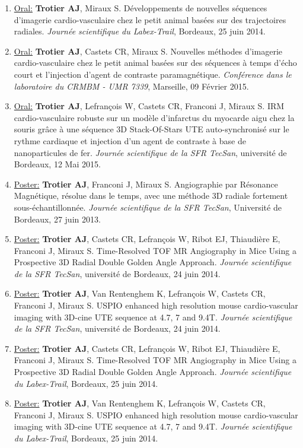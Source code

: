 \begin{enumerate}

\item \underline{Oral:} \textbf{Trotier AJ}, Miraux S. Développements de nouvelles séquences d'imagerie cardio-vasculaire chez le petit animal basées sur des trajectoires radiales. \textit{Journée scientifique du Labex-Trail}, Bordeaux, 25 juin 2014.
\item \underline{Oral:} \textbf{Trotier AJ}, Castets CR, Miraux S. Nouvelles méthodes d’imagerie cardio-vasculaire chez le petit animal basées sur des séquences à temps d’écho court et l’injection d’agent de contraste paramagnétique. \textit{Conférence dans le laboratoire du CRMBM - UMR 7339}, Marseille, 09 Février 2015.
\item \underline{Oral:} \textbf{Trotier AJ}, Lefrançois W, Castets CR, Franconi J, Miraux S. IRM cardio-vasculaire robuste sur un modèle d’infarctus du myocarde aigu chez la souris grâce à une séquence 3D Stack-Of-Stars UTE auto-synchronisé sur le rythme cardiaque et injection d’un agent de contraste à base de nanoparticules de fer. \textit{Journée scientifique de la SFR TecSan}, université de Bordeaux, 12 Mai 2015.
  
\item \underline{Poster:} \textbf{Trotier AJ}, Franconi J, Miraux S. Angiographie par Résonance Magnétique, résolue dans le temps, avec une méthode 3D radiale fortement sous-échantillonnée. \textit{Journée scientifique de la SFR TecSan}, Université de Bordeaux, 27 juin 2013.

\item \underline{Poster:} \textbf{Trotier AJ}, Castets CR, Lefrançois W, Ribot EJ, Thiaudière E, Franconi J, Miraux S. Time-Resolved TOF MR Angiography in Mice Using a Prospective 3D Radial Double Golden Angle Approach. \textit{Journée scientifique de la SFR TecSan}, université de Bordeaux, 24 juin 2014.
\item \underline{Poster:} \textbf{Trotier AJ}, Van Rentenghem K, Lefrançois W, Castets CR, Franconi J, Miraux S. USPIO enhanced high resolution mouse cardio-vascular imaging with 3D-cine UTE sequence at 4.7, 7 and 9.4T. \textit{Journée scientifique de la SFR TecSan}, université de Bordeaux, 24 juin 2014.

\item \underline{Poster:} \textbf{Trotier AJ}, Castets CR, Lefrançois W, Ribot EJ, Thiaudière E, Franconi J, Miraux S. Time-Resolved TOF MR Angiography in Mice Using a Prospective 3D Radial Double Golden Angle Approach. \textit{Journée scientifique du Labex-Trail}, Bordeaux, 25 juin 2014.
\item \underline{Poster:} \textbf{Trotier AJ}, Van Rentenghem K, Lefrançois W, Castets CR, Franconi J, Miraux S. USPIO enhanced high resolution mouse cardio-vascular imaging with 3D-cine UTE sequence at 4.7, 7 and 9.4T. \textit{Journée scientifique du Labex-Trail}, Bordeaux, 25 juin 2014.


\end{enumerate}

